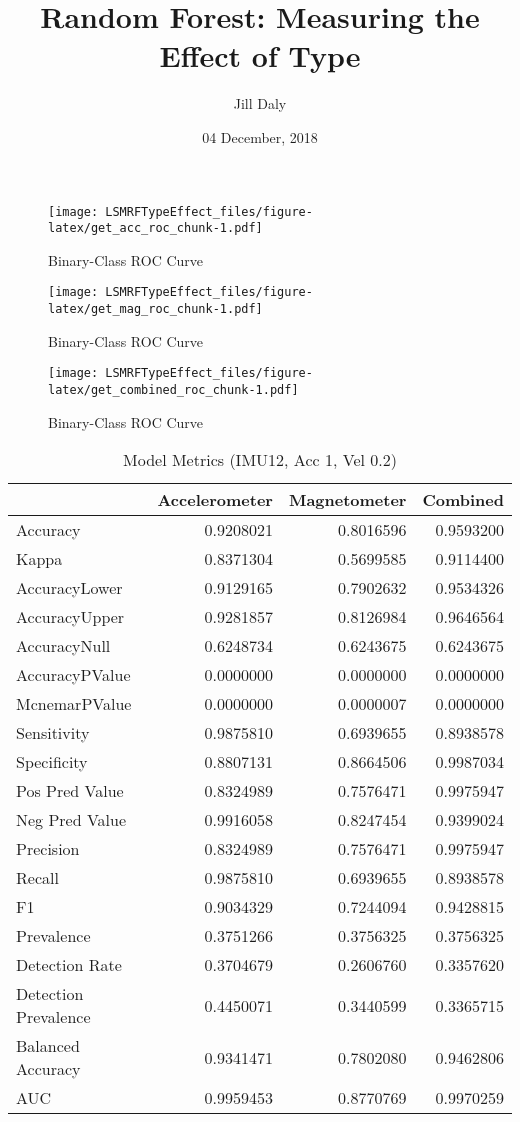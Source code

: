 \documentclass[]{article}
\title{Random Forest: Measuring the Effect of Type}
\author{Jill Daly}
\date{04 December, 2018}
\begin{document}
\maketitle

\begin{figure}
\centering
\texttt{[image: LSMRFTypeEffect\_files/figure-latex/get\_acc\_roc\_chunk-1.pdf]}
\caption{Binary-Class ROC Curve}
\end{figure}

\begin{figure}
\centering
\texttt{[image: LSMRFTypeEffect\_files/figure-latex/get\_mag\_roc\_chunk-1.pdf]}
\caption{Binary-Class ROC Curve}
\end{figure}

\begin{figure}
\centering
\texttt{[image: LSMRFTypeEffect\_files/figure-latex/get\_combined\_roc\_chunk-1.pdf]}
\caption{Binary-Class ROC Curve}
\end{figure}

\begin{table}[!h]

\caption{\label{tab:all_accuracy_chunk}Model Metrics (IMU12, Acc 1, Vel 0.2)}
\centering
\begin{tabular}[t]{lrrr}
\toprule
  & Accelerometer & Magnetometer & Combined\\
\midrule
Accuracy & 0.9208021 & 0.8016596 & 0.9593200\\
Kappa & 0.8371304 & 0.5699585 & 0.9114400\\
AccuracyLower & 0.9129165 & 0.7902632 & 0.9534326\\
AccuracyUpper & 0.9281857 & 0.8126984 & 0.9646564\\
AccuracyNull & 0.6248734 & 0.6243675 & 0.6243675\\
\addlinespace
AccuracyPValue & 0.0000000 & 0.0000000 & 0.0000000\\
McnemarPValue & 0.0000000 & 0.0000007 & 0.0000000\\
Sensitivity & 0.9875810 & 0.6939655 & 0.8938578\\
Specificity & 0.8807131 & 0.8664506 & 0.9987034\\
Pos Pred Value & 0.8324989 & 0.7576471 & 0.9975947\\
\addlinespace
Neg Pred Value & 0.9916058 & 0.8247454 & 0.9399024\\
Precision & 0.8324989 & 0.7576471 & 0.9975947\\
Recall & 0.9875810 & 0.6939655 & 0.8938578\\
F1 & 0.9034329 & 0.7244094 & 0.9428815\\
Prevalence & 0.3751266 & 0.3756325 & 0.3756325\\
\addlinespace
Detection Rate & 0.3704679 & 0.2606760 & 0.3357620\\
Detection Prevalence & 0.4450071 & 0.3440599 & 0.3365715\\
Balanced Accuracy & 0.9341471 & 0.7802080 & 0.9462806\\
AUC & 0.9959453 & 0.8770769 & 0.9970259\\
\bottomrule
\end{tabular}
\end{table}
\end{document}
